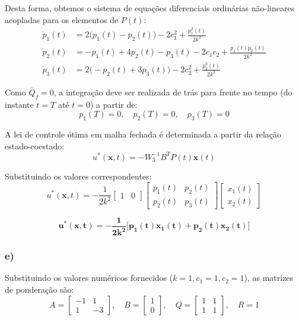\documentclass[a4paper, 12pt]{article}%
\begin{document}
Desta forma, obtemos o sistema de equações diferenciais ordinárias não-lineares acopladas para os elementos de $P(t)$:
\begin{align*}
\dot{p}_1(t) &= 2\big(p_1(t) - p_2(t)\big) - 2c_1^2 + \frac{p_1^2(t)}{2k^2} \\
\dot{p}_2(t) &= -p_1(t) + 4p_2(t) - p_3(t) - 2c_1c_2 + \frac{p_1(t)p_2(t)}{2k^2} \\
\dot{p}_3(t) &= 2\big(-p_2(t) + 3p_3(t)\big) - 2c_2^2 + \frac{p_2^2(t)}{2k^2}
\end{align*}

Como $\bar{Q}_f = 0$, a integração deve ser realizada de trás para frente no tempo (do instante $t = T$ até $t = 0$) a partir de:
\begin{equation}
p_1(T) = 0, \quad p_2(T) = 0, \quad p_3(T) = 0
\end{equation}


A lei de controle ótima em malha fechada é determinada a partir da relação estado-coestado:
\begin{equation}
u^*(\mathbf{x},t) = -W_3^{-1} B^T P(t) \mathbf{x}(t)
\end{equation}

Substituindo os valores correspondentes:
\begin{equation}
u^*(\mathbf{x},t) = -\frac{1}{2k^2} \begin{bmatrix} 1 & 0 \end{bmatrix} \begin{bmatrix} p_1(t) & p_2(t) \\ p_2(t) & p_3(t) \end{bmatrix} \begin{bmatrix} x_1(t) \\ x_2(t) \end{bmatrix}
\end{equation}

\begin{equation}
\mathbf{u^*(\mathbf{x},t) = -\frac{1}{2k^2} \big[ p_1(t)x_1(t) + p_2(t)x_2(t) \big]}
\end{equation}

\subsubsection*{e)}

Substituindo os valores numéricos fornecidos ($k=1, c_1=1, c_2=1$), as matrizes de ponderação são:
\begin{equation}
A = \begin{bmatrix} -1 & 1 \\ 1 & -3 \end{bmatrix}, \quad B = \begin{bmatrix} 1 \\ 0 \end{bmatrix}, \quad Q = \begin{bmatrix} 1 & 1 \\ 1 & 1 \end{bmatrix}, \quad R = 1
\end{equation}
\end{document}
